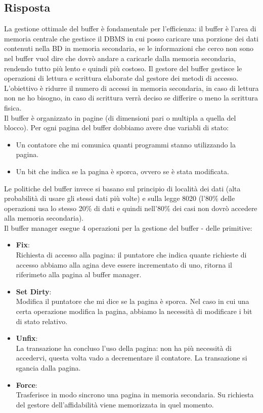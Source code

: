 \documentclass{article}
\begin{document}
\subsection*{Risposta}
La gestione ottimale del buffer è fondamentale per l'efficienza: il buffer è l'area di memoria centrale che gestisce il DBMS in cui posso caricare una porzione dei dati contenuti nella BD in memoria secondaria, se le informazioni che cerco non sono nel buffer vuol dire che dovrò andare a caricarle dalla memoria secondaria,
rendendo tutto più lento e quindi più costoso. Il gestore del buffer gestisce le operazioni di lettura e scrittura elaborate dal gestore dei metodi di accesso. L'obiettivo è ridurre il numero di accessi in memoria secondaria, in caso di lettura non ne ho bisogno, in caso di scrittura verrà deciso se differire o meno la scrittura fisica.\\
Il buffer è organizzato in pagine (di dimensioni pari o multipla a quella del blocco). Per ogni pagina del buffer dobbiamo avere due variabli di stato: 
\begin{itemize}
    \item Un contatore che mi comunica quanti programmi stanno utilizzando la pagina.
    \item Un bit che indica se la pagina è sporca, ovvero se è stata modificata.
\end{itemize}
Le politiche del buffer invece si basano sul principio di località dei dati (alta probabilità di usare gli stessi dati più volte) e sulla legge 8020 (l'80\% delle operazioni usa lo stesso 20\% di dati e quindi nell'80\% dei casi non dovrò accedere alla memoria secondaria).\\
Il buffer manager esegue 4 operazioni per la gestione del buffer - delle primitive:
\begin{itemize}
    \item \textbf{Fix}:\\Richiesta di accesso alla pagina: il puntatore che indica quante richieste di accesso abbiamo alla agina deve essere incrementato di uno, ritorna il riferimeto alla pagina al buffer manager.
    \item \textbf{Set Dirty}:\\Modifica il puntatore che mi dice se la pagina è sporca. Nel caso in cui una certa operazione modifica la pagina, abbiamo la necessità di modificare i bit di stato relativo.
    \item \textbf{Unfix}:\\La transazione ha concluso l'uso della pagina: non ha più necessità di accedervi, questa volta vado a decrementare il contatore. La transazione si sgancia dalla pagina.
    \item \textbf{Force}:\\Trasferisce in modo sincrono una pagina in memoria secondaria. Su richiesta del gestore dell'affidabilità viene memorizzata in quel momento.
\end{itemize}
\end{document}
